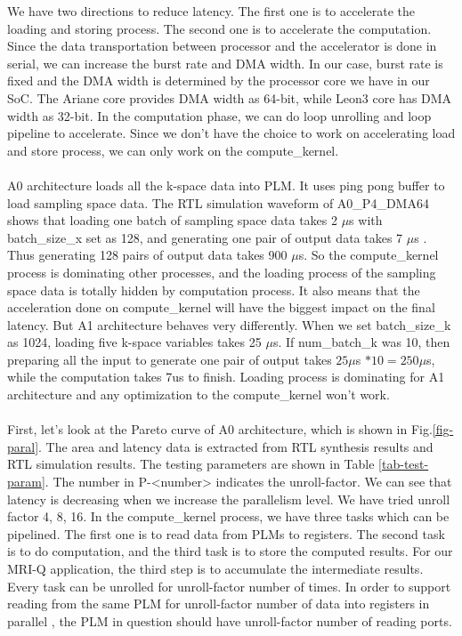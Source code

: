 We have two directions to reduce latency. The first one is to accelerate the
loading and storing process. The second one is to accelerate the
computation. Since the data transportation between processor and the accelerator
is done in serial, we can increase the burst rate and DMA width. In our case,
burst rate is fixed and the DMA width is determined by the processor core we
have in our SoC. The Ariane core provides DMA width as 64-bit, while Leon3 core
has DMA width as 32-bit. In the computation phase, we can do loop unrolling and
loop pipeline to accelerate. Since we don't have the choice to work on
accelerating load and store process, we can only work on the
compute\_kernel. \\ \\
%
A0 architecture loads all the k-space data into PLM. It uses ping pong buffer to
load sampling space data. The RTL simulation waveform of A0\_P4\_DMA64 shows
that loading one batch of sampling space data takes 2 $\mu$s with batch\_size\_x
set as 128, and generating one pair of output data takes 7 $\mu$s . Thus
generating 128 pairs of output data takes 900 $\mu$s. So the compute\_kernel
process is dominating other processes, and the loading process of the sampling
space data is totally hidden by computation process. It also means that the
acceleration done on compute\_kernel will have the biggest impact on the final
latency. But A1 architecture behaves very differently. When we set
batch\_size\_k as 1024, loading five k-space variables takes 25 $\mu$s. If
num\_batch\_k was 10, then preparing all the input to generate one pair of
output takes $25\mu$s $* 10 = 250\mu$s, while the computation takes 7us to
finish. Loading process is dominating for A1 architecture and any optimization
to the compute\_kernel won't work. \\ \\
%
First, let's look at the Pareto curve of A0 architecture, which is shown in
Fig.\ref{fig-paral}. The area and latency data is extracted from RTL synthesis
results and RTL simulation results. The testing parameters are shown in Table
\ref{tab-test-param}. The number in P-<number> indicates the unroll-factor. We
can see that latency is decreasing when we increase the parallelism level. We
have tried unroll factor 4, 8, 16. In the compute\_kernel process, we have three
tasks which can be pipelined. The first one is to read data from PLMs to
registers. The second task is to do computation, and the third task is to store
the computed results. For our MRI-Q application, the third step is to accumulate
the intermediate results. Every task can be unrolled for unroll-factor number of
times. In order to support reading from the same PLM for unroll-factor number of
data into registers in parallel , the PLM in question should have unroll-factor
number of reading ports.

